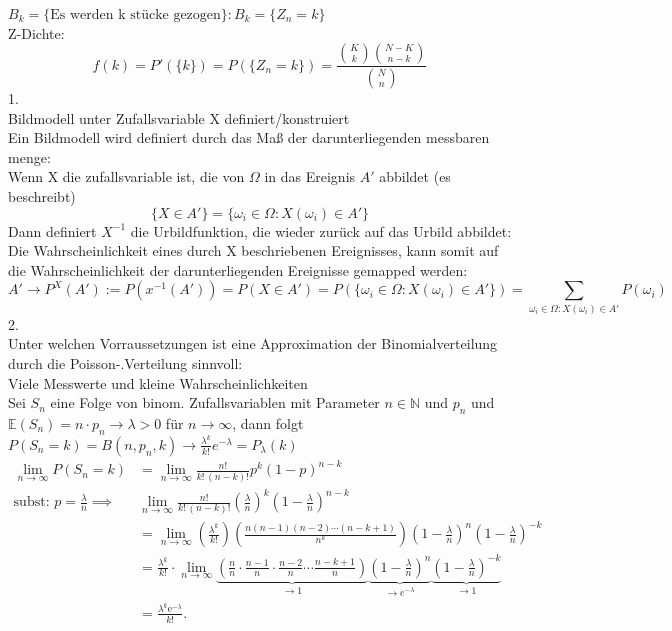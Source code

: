 \documentclass{article}
\begin{document}
	$B_k = \{\text{Es werden k stücke gezogen}\}: B_k =\{Z_n=k\}$\\
	Z-Dichte:
	\[f(k)=P'(\{k\}) = P(\{Z_n=k\})=\frac{\binom{K}{k}\binom{N-K}{n-k}}{\binom{N}{n}}\]
	1.\\
	Bildmodell unter Zufallsvariable X definiert/konstruiert\\
	Ein Bildmodell wird definiert durch das Maß der darunterliegenden messbaren menge:\\
	Wenn X die zufallsvariable ist, die von $\Omega$ in das Ereignis $A'$ abbildet (es beschreibt)
	\[\{X\in A'\} = \{\omega_i\in\Omega: X(\omega_i)\in A'\}\]
	Dann definiert $X^{-1}$ die Urbildfunktion, die wieder zurück auf das Urbild abbildet:\\
	Die Wahrscheinlichkeit eines durch X beschriebenen Ereignisses, kann somit auf die Wahrscheinlichkeit der darunterliegenden Ereignisse gemapped werden:\\
	\[A'\to P^X (A'):= P(x^{-1}(A')) = P(X\in A') = P(\{\omega_i\in\Omega: X(\omega_i)\in A'\}) = \sum_{\omega_i\in\Omega: X(\omega_i)\in A'} P(\omega_i)\]
	2.\\
	Unter welchen Vorraussetzungen ist eine Approximation der Binomialverteilung durch die Poisson-.Verteilung sinnvoll:\\
	Viele Messwerte und kleine Wahrscheinlichkeiten\\
	Sei $S_n$ eine Folge von binom. Zufallsvariablen mit Parameter $n\in\mathbb{N}$ und $p_n$ und $\mathbb{E}(S_n) = n\cdot p_n\to \lambda >0$ für $n\to\infty$, dann folgt\\
	$P(S_n=k)= B(n,p_n,k) \to \frac{\lambda^k}{k!} e^{-\lambda} = P_\lambda(k)$\\
	\begin{align}\lim_{n\to\infty}P(S_n=k) & = \lim_{n\to\infty}\frac{n!}{k!\,(n-k)!}p^{k}\left(1-p\right)^{n-k}\\
	\text{subst: }p=\frac{\lambda}{n}\implies&  \lim_{n\to\infty}\frac{n!}{k!\,(n-k)!}\left(\frac{\lambda}{n}\right)^{k}\left(1-\frac{\lambda}{n}\right)^{n-k}\\
	 & =\lim_{n\to\infty}\left(\frac{\lambda^{k}}{k!}\right)\left(\frac{n(n-1)(n-2)\cdots(n-k+1)}{n^{k}}\right)\left(1-\frac{\lambda}{n}\right)^{n}\left(1-\frac{\lambda}{n}\right)^{-k}\\
	 & =\frac{\lambda^{k}}{k!}\cdot\lim_{n\to\infty}\underbrace{\left(\frac{n}{n}\cdot\frac{n-1}{n}\cdot\frac{n-2}{n}\cdots\frac{n-k+1}{n}\right)}_{\to1}\underbrace{\left(1-\frac{\lambda}{n}\right)^{n}}_{\to e^{-\lambda}}\underbrace{\left(1-\frac{\lambda}{n}\right)^{-k}}_{\to1}\\
	 & =\frac{\lambda^{k}\mathrm{e}^{-\lambda}}{k!}.
	 \end{align}
\end{document}
